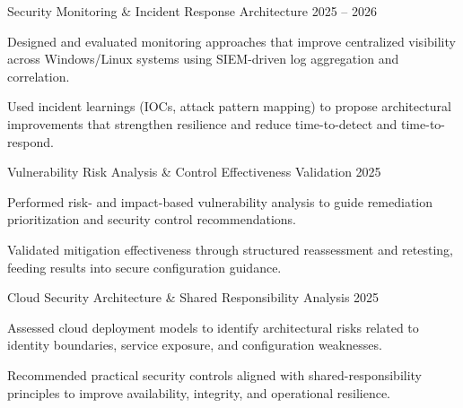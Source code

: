 


\begin{cventries}

  \cventry
    {Security Monitoring \& Incident Response Architecture}
    {2025 -- 2026}
    {
      \begin{cvitems}
        \item {Designed and evaluated monitoring approaches that improve centralized visibility across Windows/Linux systems using SIEM-driven log aggregation and correlation.}
        \item {Used incident learnings (IOCs, attack pattern mapping) to propose architectural improvements that strengthen resilience and reduce time-to-detect and time-to-respond.}
      \end{cvitems}
    }
    \vspace{10mm} 

  \cventry
    {Vulnerability Risk Analysis \& Control Effectiveness Validation}
    {2025}
    {
      \begin{cvitems}
        \item {Performed risk- and impact-based vulnerability analysis to guide remediation prioritization and security control recommendations.}
        \item {Validated mitigation effectiveness through structured reassessment and retesting, feeding results into secure configuration guidance.}
      \end{cvitems}
    }
    \vspace{4mm}

  \cventry
    {Cloud Security Architecture \& Shared Responsibility Analysis}
    {2025}
    {
      \begin{cvitems}
        \item {Assessed cloud deployment models to identify architectural risks related to identity boundaries, service exposure, and configuration weaknesses.}
        \item {Recommended practical security controls aligned with shared-responsibility principles to improve availability, integrity, and operational resilience.}
      \end{cvitems}
    }
    \vspace{4mm}


\end{cventries}

